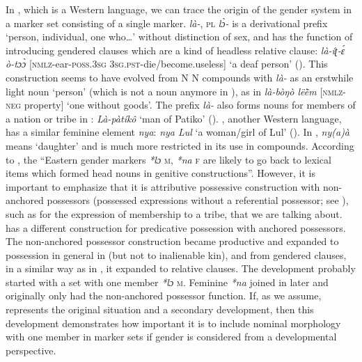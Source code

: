 \documentclass[output=collectionpaper]{langsci/langscibook}
\begin{document}
In , which is a Western  language, we can trace the origin of the gender system in a marker set consisting of a single marker.  \textit{là-}, \textsc{pl} \textit{lɔ̀-} is a derivational prefix `person, individual, one who{\dots}' without distinction of sex, and has the function of introducing gendered clauses which are a kind of headless relative clause: \textit{là-íʈ-ɛ́ ò-tɔɔ̀} [\textsc{nmlz}-ear-\textsc{poss.3sg} \textsc{3sg.pst}-die/become.useless] `a deaf person' (\citealt[37]{Crazzolara1955}). This construction seems to have evolved from N N compounds with \textit{là-} as an erstwhile light noun `person' (which is not a noun anymore in ), as in \textit{là-bòŋò lëë̀m} [\textsc{nmlz-neg} property] `one without goods'. The prefix \textit{là-} also forms nouns for members of a nation or tribe in : \textit{Là-pàtíkô} `man of Patiko' (\citealt[42]{Crazzolara1955}). , another Western  language, has a similar feminine element \textit{nya}: \textit{nya Lul} `a woman/girl of Lul' (\citealt[17]{Kohnen1933}). In , \textit{ny(a)à} means `daughter' and is much more restricted in its use in compounds. According to \cite[263]{Heine1983}, the ``Eastern  gender markers \textit{*lɔ} \textsc{m}, \textit{*na} \textsc{f} are likely to go back to lexical items which formed head nouns in genitive constructions''. However, it is important to emphasize that it is attributive possessive construction with non-anchored possessors (possessed expressions without a referential possessor; see \citealt{Koptjevskaja-Tamm2005}), such as for the expression of membership to a tribe, that we are talking about.  has a different construction for predicative possession with anchored possessors. The non-anchored possessor construction became productive and expanded to possession in general in  (but not to inalienable kin), and from gendered clauses, in a similar way as in , it expanded to relative clauses. The development probably started with a set with one member \textit{*lɔ} \textsc{m}. Feminine \textit{*na} joined in later and originally only had the non-anchored possessor function. If, as we assume,  represents the original situation and  a secondary development, then this development demonstrates how important it is to include nominal morphology with one member in marker sets if gender is considered from a developmental perspective.
\end{document}
